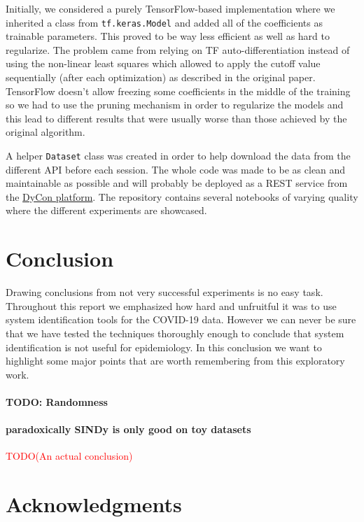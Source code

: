 \documentclass[12pt, letterpaper]{article}
\newcommand{\com}[1]{{\small {\fontfamily{ptm} \selectfont \textcolor{red}{#1}}}}
\begin{document}
Initially, we considered a purely TensorFlow-based implementation where we inherited a class from \texttt{tf.keras.Model} and added all of the coefficients as trainable parameters. 
This proved to be way less efficient as well as hard to regularize. 
The problem came from relying on TF auto-differentiation instead of using the non-linear least squares which allowed to apply the cutoff value sequentially (after each optimization) as described in the original paper. 
TensorFlow doesn't allow freezing some coefficients in the middle of the training so we had to use the pruning mechanism in order to regularize the models and this lead to different results that were usually worse than those achieved by the original algorithm.

A helper \texttt{Dataset} class was created in order to help download the data from the different API before each session. 
The whole code was made to be as clean and maintainable as possible and will probably be deployed as a REST service from the \href{https://deustotech.github.io/DyCon-Blog/}{DyCon platform}.
The repository contains several notebooks of varying quality where the different experiments are showcased. 


\section{Conclusion}\label{sec:conclusion}

Drawing conclusions from not very successful experiments is no easy task.
Throughout this report we emphasized how hard and unfruitful it was to use system identification tools for the COVID-19 data.
However we can never be sure that we have tested the techniques thoroughly enough to conclude that system identification is not useful for epidemiology.
In this conclusion we want to highlight some major points that are worth remembering from this exploratory work.

\paragraph{TODO: Randomness}
\paragraph{paradoxically SINDy is only good on toy datasets}

\com{TODO(An actual conclusion)}


\section*{Acknowledgments}
\label{sec:acknowledgments}
\end{document}
